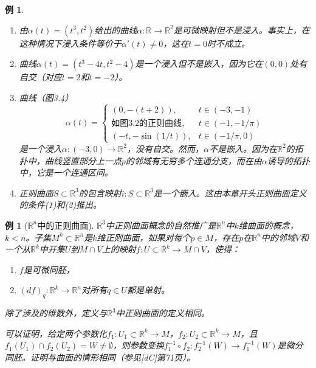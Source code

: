 \documentclass[12pt,a4paper]{ctexbook}
\newtheorem{example}[theorem]{例}
\begin{document}
\begin{example}
\begin{enumerate}[label=\alph*)]
    \item 由$\alpha(t)=(t^3,t^2)$给出的曲线$\alpha:\mathbb{R}\to\mathbb{R}^2$是可微映射但不是浸入。事实上，在这种情况下浸入条件等价于$\alpha'(t)\neq 0$，这在$t=0$时不成立。
    
    \item 曲线$\alpha(t)=(t^3-4t,t^2-4)$是一个浸入但不是嵌入，因为它在$(0,0)$处有自交（对应$t=2$和$t=-2$）。
    
    \item 曲线（图3.4）
    $$\alpha(t) = \begin{cases}
    (0, -(t+2)), & t\in(-3,-1) \\
    \text{如图3.2的正则曲线}, & t\in(-1,-1/\pi) \\
    (-t, -\sin(1/t)), & t\in(-1/\pi,0)
    \end{cases}$$
    是一个浸入$\alpha:(-3,0)\to\mathbb{R}^2$，没有自交。然而，$\alpha$不是嵌入。因为在$\mathbb{R}^2$的拓扑中，曲线竖直部分上一点$p$的邻域有无穷多个连通分支，而在由$\alpha$诱导的拓扑中，它是一个连通区间。
    
    \item 正则曲面$S\subset\mathbb{R}^3$的包含映射$i:S\subset\mathbb{R}^3$是一个嵌入。这由本章开头正则曲面定义的条件(1)和(2)推出。
\end{enumerate}
\end{example}

\begin{example}[$\mathbb{R}^n$中的正则曲面]
$\mathbb{R}^3$中正则曲面概念的自然推广是$\mathbb{R}^n$中$k$维曲面的概念，$k<n$。子集$M^k\subset\mathbb{R}^n$是$k$维正则曲面，如果对每个$p\in M$，存在$p$在$\mathbb{R}^n$中的邻域$V$和一个从$\mathbb{R}^k$中开集$U$到$M\cap V$上的映射$f:U\subset\mathbb{R}^k\to M\cap V$，使得：
\begin{enumerate}
    \item $f$是可微同胚，
    \item $(df)_q:\mathbb{R}^k\to\mathbb{R}^n$对所有$q\in U$都是单射。
\end{enumerate}

除了涉及的维数外，定义与$\mathbb{R}^3$中正则曲面的定义相同。

可以证明，给定两个参数化$f_1:U_1\subset\mathbb{R}^k\to M$，$f_2:U_2\subset\mathbb{R}^k\to M$，且$f_1(U_1)\cap f_2(U_2)=W\neq\emptyset$，则参数变换$f_1^{-1}\circ f_2:f_2^{-1}(W)\to f_1^{-1}(W)$是微分同胚。证明与曲面的情形相同（参见[dC]第71页）。
\end{example}
\end{document}
